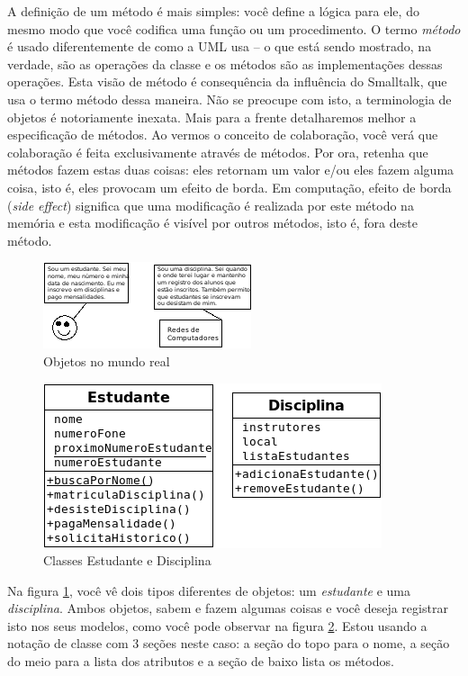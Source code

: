 \documentclass[
	article,			%
	12pt,				%
	openright,
	twoside,			%
	a4paper,			%
	english,			%
	french,
	brazil,				%
	sumario=tradicional
	]{abntex2}
\begin{document}
A definição de um método é mais simples: você define a lógica para ele, do mesmo modo que você codifica uma função ou um procedimento. O termo \emph{método} é usado diferentemente de como a UML usa -- o que está sendo mostrado, na verdade, são as operações da classe e os métodos são as implementações dessas operações. Esta visão de método é consequência da influência do Smalltalk, que usa o termo método dessa maneira. Não se preocupe com isto, a terminologia de objetos é notoriamente inexata. Mais para a frente detalharemos melhor a especificação de métodos. Ao vermos o conceito de colaboração, você verá que colaboração é feita exclusivamente através de métodos. Por ora, retenha que métodos fazem estas duas coisas: eles retornam um valor e/ou eles fazem alguma coisa, isto é, eles provocam um efeito de borda. Em computação, efeito de borda (\emph{side effect}) significa que uma modificação é realizada por este método na memória e esta modificação é visível por outros métodos, isto é, fora deste método.

\begin{figure}[h]
\begin{center}
\includegraphics[scale=1]{obj2.png} 
\caption[Objetos no mundo real]{Objetos no mundo real} \label{fig:obj2}
\end{center}
\end{figure}

\begin{figure}
\begin{center}
\includegraphics[scale=0.85]{class1.png} 
\caption{Classes Estudante e Disciplina} \label{fig:class1}
\end{center}
\end{figure}

Na figura \ref{fig:obj2}, você vê dois tipos diferentes de objetos: um \textit{estudante} e uma \textit{disciplina}. Ambos objetos, sabem e fazem algumas coisas e você deseja registrar isto nos seus modelos, como você pode observar na figura \ref{fig:class1}. Estou usando a notação de classe com 3 seções neste caso: a seção do topo para o nome, a seção do meio para a lista dos atributos e a seção de baixo lista os métodos.
\end{document}

